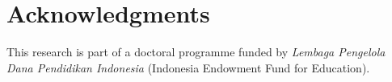 \documentclass[10pt,conference]{IEEEtran}
\begin{document}
%







\section*{Acknowledgments}
This research is part of a doctoral programme funded by \emph{Lembaga Pengelola Dana Pendidikan Indonesia} (Indonesia Endowment Fund for Education).

\end{document}
